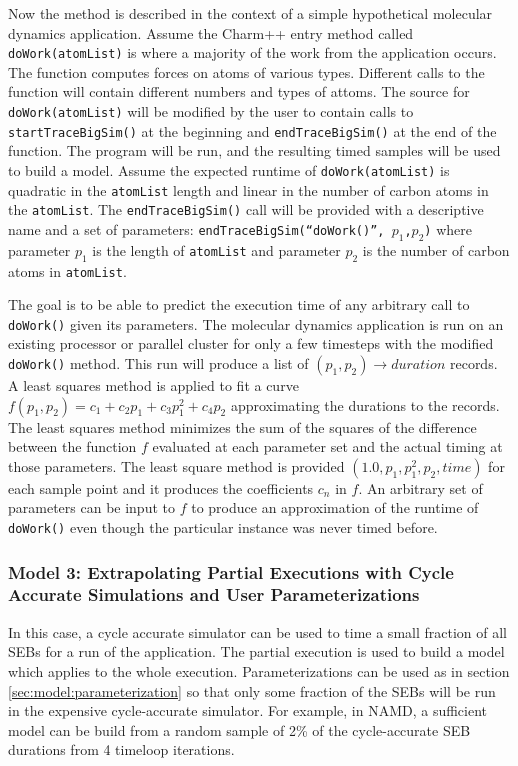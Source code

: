 Now the method is described in the context of a simple hypothetical molecular dynamics application. Assume the Charm++ entry method called \texttt{doWork(atomList)} is where a majority of the work from the application occurs. The function computes forces on atoms of various types. Different calls to the function will contain different numbers and types of attoms. The source for  \texttt{doWork(atomList)} will be modified by the user to  contain calls to  \texttt{startTraceBigSim()} at the beginning and  \texttt{endTraceBigSim()} at the end of the function. The program will be run, and the resulting timed samples will be used to build a model. Assume the expected runtime of \texttt{doWork(atomList)} is quadratic in the \texttt{atomList} length and linear in the number of carbon atoms in the \texttt{atomList}. The \texttt{endTraceBigSim()}  call will be provided with a descriptive name and a set of parameters: \texttt{endTraceBigSim(``doWork()'', $p_1$,$p_2$)}  where parameter $p_1$ is the length of \texttt{atomList} and parameter $p_2$ is the number of carbon atoms in \texttt{atomList}.

The goal is to be able to predict the execution time of any arbitrary call to \texttt{doWork()} given its parameters. The molecular dynamics application is run on an existing processor or parallel cluster for only a few timesteps with the modified \texttt{doWork()} method. This run will produce a list of $\left(p_1,p_2\right)\rightarrow duration$ records. A least squares method is applied to fit a curve $f(p_1,p_2)=c_1+c_2 p_1+c_3 p_1^2 + c_4 p_2$  approximating the durations to the records. The least squares method minimizes the sum of the squares of the difference between the function $f$ evaluated at each parameter set and the actual timing at those parameters. The least square method is provided  $\left(1.0,p_1,p_1^2,p_2,time\right)$ for each sample point and it produces the coefficients $c_n$ in $f$. An arbitrary set of parameters can be input to $f$ to produce an approximation of the runtime of \texttt{doWork()} even though the particular instance was never timed before. 

\subsubsection{Model 3: Extrapolating Partial Executions with Cycle Accurate Simulations and User Parameterizations\label{sec:model:partial}}

In this case, a cycle accurate simulator can be used to time a small fraction of all SEBs for a run of the application. The partial execution is used to build a model which applies to the whole execution. Parameterizations can be used as in section \ref{sec:model:parameterization} so that only some fraction of the SEBs will be run in the expensive cycle-accurate simulator. For example, in NAMD, a sufficient model can be build from  a random sample of 2\% of the cycle-accurate SEB durations from 4 timeloop iterations. 
